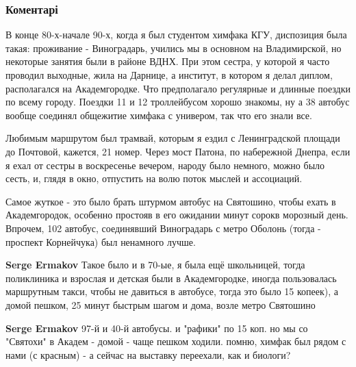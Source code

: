  
 
 
 
 
\subsubsection{Коментарі}

\begin{itemize} %

В конце 80-х-начале 90-х, когда я был студентом химфака КГУ, диспозиция была
такая: проживание - Виноградарь, учились мы в основном на Владимирской, но
некоторые занятия были в районе ВДНХ. При этом сестра, у которой я часто
проводил выходные, жила на Дарнице, а институт, в котором я делал диплом,
располагался на Академгородке. Что предполагало регулярные и длинные поездки по
всему городу. Поездки 11 и 12 троллейбусом хорошо знакомы, ну а 38 автобус
вообще соединял общежитие химфака с универом, так что его знали все.

Любимым маршрутом был трамвай, которым я ездил с Ленинградской площади до
Почтовой, кажется, 21 номер. Через мост Патона, по набережной Днепра, если я
ехал от сестры в воскресенье вечером, народу было немного, можно было сесть, и,
глядя в окно, отпустить на волю поток мыслей и ассоциаций.

Самое жуткое - это было брать штурмом автобус на Святошино, чтобы ехать в
Академгородок, особенно простояв в его ожидании минут сорокв морозный день.
Впрочем, 102 автобус, соединявший Виноградарь с метро Оболонь (тогда - проспект
Корнейчука) был ненамного лучше.

\begin{itemize} %
\textbf{Serge Ermakov} Такое было и в 70-ые, я была ещё школьницей, тогда поликлиника и взрослая и детская были в Академгородке, иногда пользовалась маршрутным такси, чтобы не давиться в автобусе, тогда это было 15 копеек), а домой пешком, 25 минут быстрым шагом и дома, возле метро Святошино

\textbf{Serge Ermakov} 97-й и 40-й автобусы. и "рафики" по 15 коп. но мы со "Святохи" в Академ - домой - чаще пешком ходили. помню, химфак был рядом с нами (с красным) - а сейчас на выставку переехали, как и биологи?


\end{itemize}
\end{itemize}
